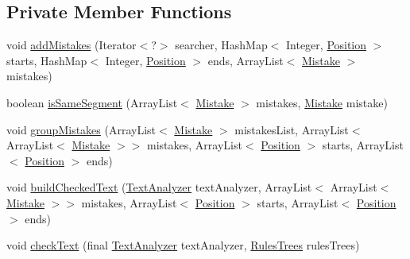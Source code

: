\subsection*{Private Member Functions}
\begin{DoxyCompactItemize}
\item 
void \hyperlink{classbr_1_1usp_1_1cata_1_1util_1_1_checker_a1ce39e11b72290628732171244e4164b}{add\+Mistakes} (Iterator$<$?$>$ searcher, Hash\+Map$<$ Integer, \hyperlink{classbr_1_1usp_1_1cata_1_1model_1_1_position}{Position} $>$ starts, Hash\+Map$<$ Integer, \hyperlink{classbr_1_1usp_1_1cata_1_1model_1_1_position}{Position} $>$ ends, Array\+List$<$ \hyperlink{classbr_1_1usp_1_1cata_1_1model_1_1_mistake}{Mistake} $>$ mistakes)
\item 
boolean \hyperlink{classbr_1_1usp_1_1cata_1_1util_1_1_checker_afaa39c2ba7ada7c1aac1ec584feceb5b}{is\+Same\+Segment} (Array\+List$<$ \hyperlink{classbr_1_1usp_1_1cata_1_1model_1_1_mistake}{Mistake} $>$ mistakes, \hyperlink{classbr_1_1usp_1_1cata_1_1model_1_1_mistake}{Mistake} mistake)
\item 
void \hyperlink{classbr_1_1usp_1_1cata_1_1util_1_1_checker_a70fd33a6fd4734374f3c22283a9fd915}{group\+Mistakes} (Array\+List$<$ \hyperlink{classbr_1_1usp_1_1cata_1_1model_1_1_mistake}{Mistake} $>$ mistakes\+List, Array\+List$<$ Array\+List$<$ \hyperlink{classbr_1_1usp_1_1cata_1_1model_1_1_mistake}{Mistake} $>$$>$ mistakes, Array\+List$<$ \hyperlink{classbr_1_1usp_1_1cata_1_1model_1_1_position}{Position} $>$ starts, Array\+List$<$ \hyperlink{classbr_1_1usp_1_1cata_1_1model_1_1_position}{Position} $>$ ends)
\item 
void \hyperlink{classbr_1_1usp_1_1cata_1_1util_1_1_checker_ac68b651d32cb5839d86de72c02e52e5e}{build\+Checked\+Text} (\hyperlink{classbr_1_1usp_1_1cata_1_1util_1_1_text_analyzer}{Text\+Analyzer} text\+Analyzer, Array\+List$<$ Array\+List$<$ \hyperlink{classbr_1_1usp_1_1cata_1_1model_1_1_mistake}{Mistake} $>$$>$ mistakes, Array\+List$<$ \hyperlink{classbr_1_1usp_1_1cata_1_1model_1_1_position}{Position} $>$ starts, Array\+List$<$ \hyperlink{classbr_1_1usp_1_1cata_1_1model_1_1_position}{Position} $>$ ends)
\item 
void \hyperlink{classbr_1_1usp_1_1cata_1_1util_1_1_checker_abf6a7a5f021e41d10fbaeeeaba9a47e8}{check\+Text} (final \hyperlink{classbr_1_1usp_1_1cata_1_1util_1_1_text_analyzer}{Text\+Analyzer} text\+Analyzer, \hyperlink{classbr_1_1usp_1_1cata_1_1util_1_1_rules_trees}{Rules\+Trees} rules\+Trees)
\end{DoxyCompactItemize}
